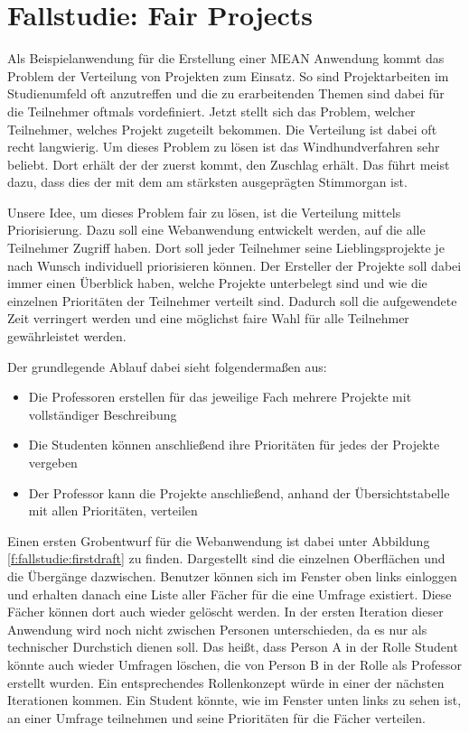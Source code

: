\section{Fallstudie: Fair Projects}
\label{fallstudie-fair-projects}

Als Beispielanwendung für die Erstellung einer MEAN Anwendung kommt das Problem der Verteilung von Projekten zum Einsatz.
So sind Projektarbeiten im Studienumfeld oft anzutreffen und die zu erarbeitenden Themen sind dabei für die Teilnehmer oftmals vordefiniert.
Jetzt stellt sich das Problem, welcher Teilnehmer, welches Projekt zugeteilt bekommen.
Die Verteilung ist dabei oft recht langwierig.
Um dieses Problem zu lösen ist das Windhundverfahren sehr beliebt. Dort erhält der der zuerst kommt, den Zuschlag erhält.
Das führt meist dazu, dass dies der mit dem am stärksten ausgeprägten Stimmorgan ist. 

Unsere Idee, um dieses Problem fair zu lösen, ist die Verteilung mittels Priorisierung.
Dazu soll eine Webanwendung entwickelt werden, auf die alle Teilnehmer Zugriff haben. 
Dort soll jeder Teilnehmer seine Lieblingsprojekte je nach Wunsch individuell priorisieren können.
Der Ersteller der Projekte soll dabei immer einen Überblick haben, welche Projekte unterbelegt sind und wie die einzelnen Prioritäten der Teilnehmer verteilt sind.
Dadurch soll die aufgewendete Zeit verringert werden und eine möglichst faire Wahl für alle Teilnehmer gewährleistet werden.

Der grundlegende Ablauf dabei sieht folgendermaßen aus:
\begin{itemize}
	\item Die Professoren erstellen für das jeweilige Fach mehrere Projekte mit vollständiger Beschreibung
	\item Die Studenten können anschließend ihre Prioritäten für jedes der Projekte vergeben
	\item Der Professor kann die Projekte anschließend, anhand der Übersichtstabelle mit allen Prioritäten, verteilen
\end{itemize}

Einen ersten Grobentwurf für die Webanwendung ist dabei unter Abbildung \ref{f:fallstudie:firstdraft} zu finden. Dargestellt sind die einzelnen Oberflächen und die Übergänge dazwischen. Benutzer können sich im Fenster oben links einloggen und erhalten danach eine Liste aller Fächer für die eine Umfrage existiert. Diese Fächer können dort auch wieder gelöscht werden. In der ersten Iteration dieser Anwendung wird noch nicht zwischen Personen unterschieden, da es nur als technischer Durchstich dienen soll. Das heißt, dass Person A in der Rolle Student könnte auch wieder Umfragen löschen, die von Person B in der Rolle als Professor erstellt wurden. Ein entsprechendes Rollenkonzept würde in einer der nächsten Iterationen kommen.
Ein Student könnte, wie im Fenster unten links zu sehen ist, an einer Umfrage teilnehmen und seine Prioritäten für die Fächer verteilen.

